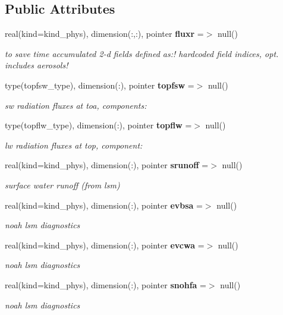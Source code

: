 \subsection*{Public Attributes}
\begin{DoxyCompactItemize}
\item 
real(kind=kind\+\_\+phys), dimension(\+:,\+:), pointer \textbf{ fluxr} =$>$ null()
\begin{DoxyCompactList}\small\item\em to save time accumulated 2-\/d fields defined as\+:! hardcoded field indices, opt. includes aerosols! \end{DoxyCompactList}\item 
type(topfsw\+\_\+type), dimension(\+:), pointer \textbf{ topfsw} =$>$ null()
\begin{DoxyCompactList}\small\item\em sw radiation fluxes at toa, components\+: \end{DoxyCompactList}\item 
type(topflw\+\_\+type), dimension(\+:), pointer \textbf{ topflw} =$>$ null()
\begin{DoxyCompactList}\small\item\em lw radiation fluxes at top, component\+: \end{DoxyCompactList}\item 
real(kind=kind\+\_\+phys), dimension(\+:), pointer \textbf{ srunoff} =$>$ null()
\begin{DoxyCompactList}\small\item\em surface water runoff (from lsm) \end{DoxyCompactList}\item 
real(kind=kind\+\_\+phys), dimension(\+:), pointer \textbf{ evbsa} =$>$ null()
\begin{DoxyCompactList}\small\item\em noah lsm diagnostics \end{DoxyCompactList}\item 
real(kind=kind\+\_\+phys), dimension(\+:), pointer \textbf{ evcwa} =$>$ null()
\begin{DoxyCompactList}\small\item\em noah lsm diagnostics \end{DoxyCompactList}\item 
real(kind=kind\+\_\+phys), dimension(\+:), pointer \textbf{ snohfa} =$>$ null()
\begin{DoxyCompactList}\small\item\em noah lsm diagnostics \end{DoxyCompactList}\item 

\end{DoxyCompactItemize}
